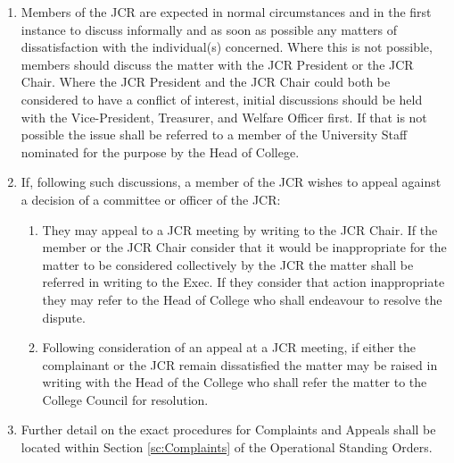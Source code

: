 \begin{enumerate}
    \item Members of the JCR are expected in normal circumstances and in the first instance to discuss informally and as soon as possible any matters of dissatisfaction with the individual(s) concerned. Where this is not possible, members should discuss the matter with the JCR President or the JCR Chair. Where the JCR President and the JCR Chair could both be considered to have a conflict of interest, initial discussions should be held with the Vice-President, Treasurer, and Welfare Officer first. If that is not possible the issue shall be referred to a member of the University Staff nominated for the purpose by the Head of College.
    \item If, following such discussions, a member of the JCR wishes to appeal against a decision of a committee or officer of the JCR:
    \begin{enumerate}
        \item They may appeal to a JCR meeting by writing to the JCR Chair. If the member or the JCR Chair consider that it would be inappropriate for the matter to be considered collectively by the JCR the matter shall be referred in writing to the Exec. If they consider that action inappropriate they may refer to the Head of College who shall endeavour to resolve the dispute.
        \item Following consideration of an appeal at a JCR meeting, if either the complainant or the JCR remain dissatisfied the matter may be raised in writing with the Head of the College who shall refer the matter to the College Council for resolution.
    \end{enumerate}
    \item Further detail on the exact procedures for Complaints and Appeals shall be located within Section \ref{sc:Complaints} of the Operational Standing Orders.
\end{enumerate}